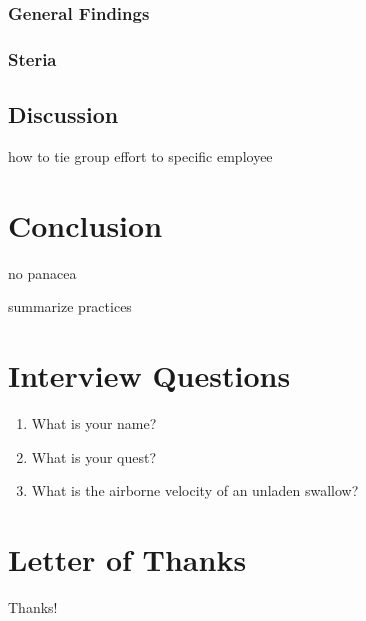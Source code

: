 \documentclass[letterpaper, 12pt]{report}
\begin{document}
\subsection{General Findings}
\subsection{Steria}

\section{Discussion}
how to tie group effort to specific employee

\chapter{Conclusion}
no panacea

summarize practices

\appendix
\chapter{Interview Questions}
\begin{enumerate}[leftmargin=*]
	\item What is your name?
	\item What is your quest?
	\item What is the airborne velocity of an unladen swallow?
\end{enumerate}

\chapter{Letter of Thanks}
Thanks!

\nocite{*}
\printbibliography
{}
{}
\end{document}
